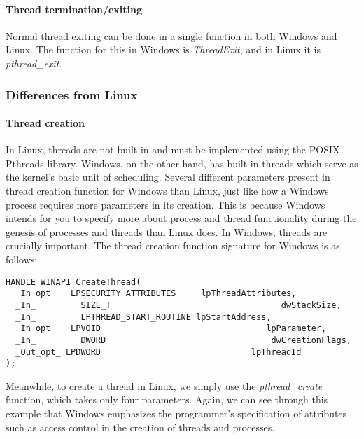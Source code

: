 \documentclass[letterpaper,10pt,titlepage]{article}
\begin{document}
\paragraph{Thread termination/exiting}
Normal thread exiting can be done in a single function in both Windows and Linux. The function for this in Windows is \emph{ThreadExit}, and in Linux it is \emph{pthread_exit}.

\subsubsection{Differences from Linux}
\paragraph{Thread creation}
In Linux, threads are not built-in and must be implemented using the POSIX Pthreads library. Windows, on the other hand, has built-in threads which serve as the kernel's basic unit of scheduling. Several different parameters present in thread creation function for Windows than Linux, just like how a Windows process requires more parameters in its creation. This is because Windows intends for you to specify more about process and thread functionality during the genesis of processes and threads than Linux does. In Windows, threads are crucially important. The thread creation function signature for Windows is as follows:
\begin{lstlisting}
HANDLE WINAPI CreateThread(
  _In_opt_   LPSECURITY_ATTRIBUTES     lpThreadAttributes,
  _In_         SIZE_T                                  dwStackSize,
  _In_         LPTHREAD_START_ROUTINE lpStartAddress,
  _In_opt_   LPVOID                                 lpParameter,
  _In_         DWORD                                 dwCreationFlags,
  _Out_opt_ LPDWORD                              lpThreadId
);
\end{lstlisting}
Meanwhile, to create a thread in Linux, we simply use the \emph{pthread_create} function, which takes only four parameters. Again, we can see through this example that Windows emphasizes the programmer's specification of attributes such as access control in the creation of threads and processes.
\end{document}
